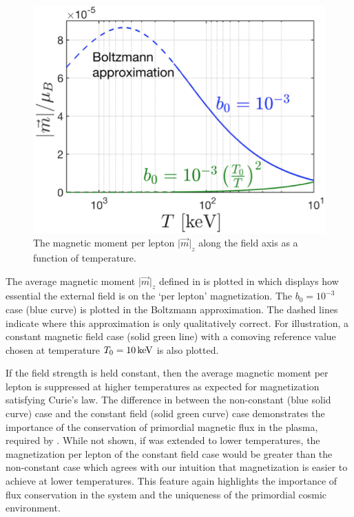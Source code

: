 \begin{figure}[ht]
 \centering
 \includegraphics[clip, trim=0.0cm 0.0cm 0.0cm 0.0cm,width=0.95\linewidth]{plots/thesis_perlepton.png}
 \caption{The magnetic moment per lepton $\vert\vec{m}\vert_{z}$ along the field axis as a function of temperature. }
 \label{fig:momentperlepton}
\end{figure}

The average magnetic moment $\vert\vec{m}\vert_{z}$ defined in  is plotted in  which displays how essential the external field is on the `per lepton' magnetization. The $b_{0}=10^{-3}$ case (blue curve) is plotted in the Boltzmann approximation. The dashed lines indicate where this approximation is only qualitatively correct. For illustration, a constant magnetic field case (solid green line) with a comoving reference value chosen at temperature $T_{0}=10\text{\,keV}$ is also plotted.

If the field strength is held constant, then the average magnetic moment per lepton is suppressed at higher temperatures as expected for magnetization satisfying Curie's law. The difference in  between the non-constant (blue solid curve) case and the constant field (solid green curve) case demonstrates the importance of the conservation of primordial magnetic flux in the plasma, required by . While not shown, if  was extended to lower temperatures, the magnetization per lepton of the constant field case would be greater than the non-constant case which agrees with our intuition that magnetization is easier to achieve at lower temperatures. This feature again highlights the importance of flux conservation in the system and the uniqueness of the primordial cosmic environment.

